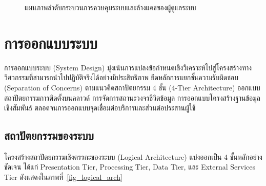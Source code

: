 \begin{figure}[H]
{\begin{tikzpicture}
\end{tikzpicture}%
}
\caption{แผนภาพลำดับกระบวนการควบคุมระบบและล้างแคชของผู้ดูแลระบบ}
\label{fig_seq_admin}
\end{figure}

\section{การออกแบบระบบ}

การออกแบบระบบ (System Design) มุ่งเน้นการแปลงข้อกำหนดเชิงวิเคราะห์ไปสู่โครงสร้างทางวิศวกรรมที่สามารถนำไปปฏิบัติจริงได้อย่างมีประสิทธิภาพ ยึดหลักการแยกชั้นความรับผิดชอบ (Separation of Concerns) ตามแนวคิดสถาปัตยกรรม 4 ชั้น (4-Tier Architecture) ออกแบบสถาปัตยกรรมการติดตั้งบนคลาวด์ การจัดการสถานะวงจรชีวิตข้อมูล การออกแบบโครงสร้างฐานข้อมูลเชิงสัมพันธ์ ตลอดจนการออกแบบจุดเชื่อมต่อบริการและส่วนต่อประสานผู้ใช้

\subsection{สถาปัตยกรรมของระบบ}

โครงสร้างสถาปัตยกรรมเชิงตรรกะของระบบ (Logical Architecture) แบ่งออกเป็น 4 ชั้นหลักอย่างชัดเจน ได้แก่ Presentation Tier, Processing Tier, Data Tier, และ External Services Tier ดังแสดงในภาพที่~\ref{fig_logical_arch}

